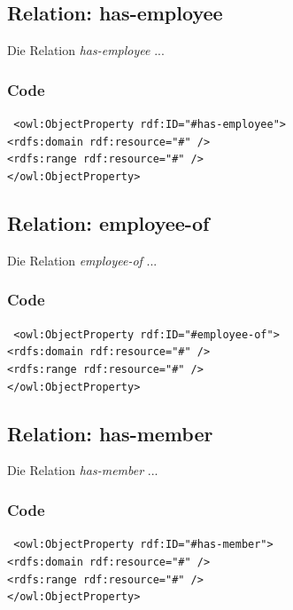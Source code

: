 ﻿\documentclass[
    11pt,
    latin1,
    a4paper,
    oneside
]{scrreprt}
\begin{document}
\subsection{Relation: has-employee} \label{sec:rel_hasemployee}

Die Relation \emph{has-employee} ...

\subsubsection{Code} \label{sec:rel_hasemployee_code}

\texttt{ <owl:ObjectProperty rdf:ID="#has-employee"> \\
	<rdfs:domain rdf:resource="#" /> \\
	<rdfs:range rdf:resource="#" /> \\
</owl:ObjectProperty> }


\subsection{Relation: employee-of} \label{sec:rel_employeeof}

Die Relation \emph{employee-of} ...

\subsubsection{Code} \label{sec:rel_employeeof_code}

\texttt{ <owl:ObjectProperty rdf:ID="#employee-of"> \\
	<rdfs:domain rdf:resource="#" /> \\
	<rdfs:range rdf:resource="#" /> \\
</owl:ObjectProperty> }


\subsection{Relation: has-member} \label{sec:rel_hasmember}

Die Relation \emph{has-member} ...

\subsubsection{Code} \label{sec:rel_hasmember_code}

\texttt{ <owl:ObjectProperty rdf:ID="#has-member"> \\
	<rdfs:domain rdf:resource="#" /> \\
	<rdfs:range rdf:resource="#" /> \\
</owl:ObjectProperty> }
\end{document}
